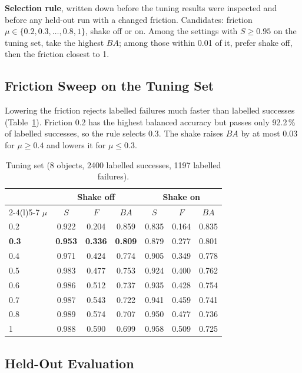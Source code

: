 \documentclass[conference]{IEEEtran}
\begin{document}
\textbf{Selection rule}, written down before the tuning results were inspected and before any held-out run
with a changed friction. Candidates: friction $\mu \in \{0.2, 0.3, \dots, 0.8, 1\}$, shake off or on.
Among the settings with $S \ge 0.95$ on the tuning set, take the highest $\mathit{BA}$; among those
within 0.01 of it, prefer shake off, then the friction closest to 1.

\subsection{Friction Sweep on the Tuning Set}\label{app:sweep}

Lowering the friction rejects labelled failures much faster than labelled successes
(Table~\ref{tab:sweep}). Friction 0.2 has the highest balanced accuracy but passes only 92.2\,\% of
labelled successes, so the rule selects 0.3. The shake raises $\mathit{BA}$ by at most 0.03 for
$\mu \ge 0.4$ and lowers it for $\mu \le 0.3$.

\begin{table}[!h]
  \centering
  \caption{Tuning set (8 objects, 2400 labelled successes, 1197 labelled failures).}
  \label{tab:sweep}
  \begin{tabular}{@{}lcccccc@{}}
    \toprule
    & \multicolumn{3}{c}{Shake off} & \multicolumn{3}{c}{Shake on} \\
    \cmidrule(lr){2-4}\cmidrule(l){5-7}
    $\mu$ & $S$ & $F$ & $\mathit{BA}$ & $S$ & $F$ & $\mathit{BA}$ \\
    \midrule
    0.2 & 0.922 & 0.204 & 0.859 & 0.835 & 0.164 & 0.835 \\
    \textbf{0.3} & \textbf{0.953} & \textbf{0.336} & \textbf{0.809} & 0.879 & 0.277 & 0.801 \\
    0.4 & 0.971 & 0.424 & 0.774 & 0.905 & 0.349 & 0.778 \\
    0.5 & 0.983 & 0.477 & 0.753 & 0.924 & 0.400 & 0.762 \\
    0.6 & 0.986 & 0.512 & 0.737 & 0.935 & 0.428 & 0.754 \\
    0.7 & 0.987 & 0.543 & 0.722 & 0.941 & 0.459 & 0.741 \\
    0.8 & 0.989 & 0.574 & 0.707 & 0.950 & 0.477 & 0.736 \\
    1   & 0.988 & 0.590 & 0.699 & 0.958 & 0.509 & 0.725 \\
    \bottomrule
  \end{tabular}
\end{table}

\subsection{Held-Out Evaluation}\label{app:heldout}
\end{document}
